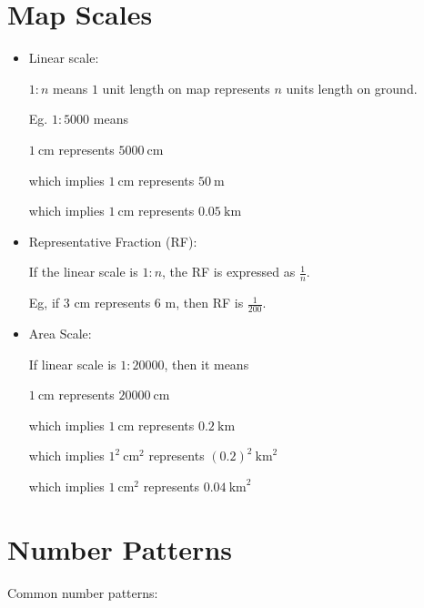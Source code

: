 \documentclass[twocolumn]{article}
\begin{document}
\section*{Map Scales}

\begin{itemize}  
	
	\item Linear scale:
	
	$1: n$ means $1$ unit length on map represents $n$ units length on ground.
	
	Eg. $1 : 5000$ means
	
	$1 \mathrm{~cm}$ represents $5000 \mathrm{~cm}$
	
	which implies $1 \mathrm{~cm}$ represents $50 \mathrm{~m}$
	
	which implies $1 \mathrm{~cm}$ represents $0.05 \mathrm{~km}$
	
	\item Representative Fraction (RF):
	
	If the linear scale is $1:n$, the RF is expressed as $\frac{1}{n}$.
	
	Eg, if 3 cm represents 6 m, then RF is $\frac{1}{200}$.
	
	\item Area Scale:
	
	If linear scale is $1:20000$, then it means 
	
	$1 \mathrm{~cm}$ represents $20000 \mathrm{~cm}$
	
	which implies  $1 \mathrm{~cm}$ represents $0.2 \mathrm{~km}$
	
	which implies $1^2 \mathrm{~cm}^2$ represents $(0.2)^2 \mathrm{~km}^2$
	
	which implies $1 \mathrm{~cm}^2$ represents $0.04 \mathrm{~km}^2$

\end{itemize} 

\section*{Number Patterns}

\noindent
Common number patterns:
\end{document}
